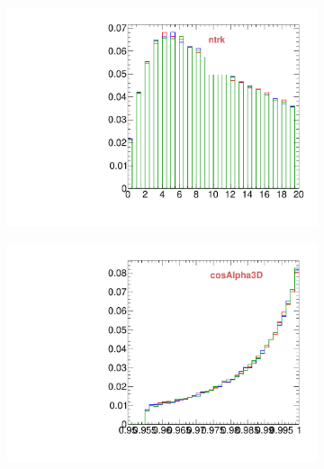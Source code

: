 \begin{figure}
        \centering
        \begin{subfigure}[b]{0.2\textwidth}
                \centering
                \includegraphics[width=\textwidth]{Figures/VariablesComparison/Data_endcaps_figs_3h/ntrk}
                \label{fig:Data_endcaps_ntrk_3h}
        \end{subfigure}
        \begin{subfigure}[b]{0.2\textwidth}
                \centering
                \includegraphics[width=\textwidth]{Figures/VariablesComparison/Data_endcaps_figs_3h/cosAlpha3D}
                \label{fig:Data_endcaps_cosAlpha3D_3h}
        \end{subfigure}
        \begin{subfigure}[b]{0.2\textwidth}

\end{subfigure}
\end{figure}
